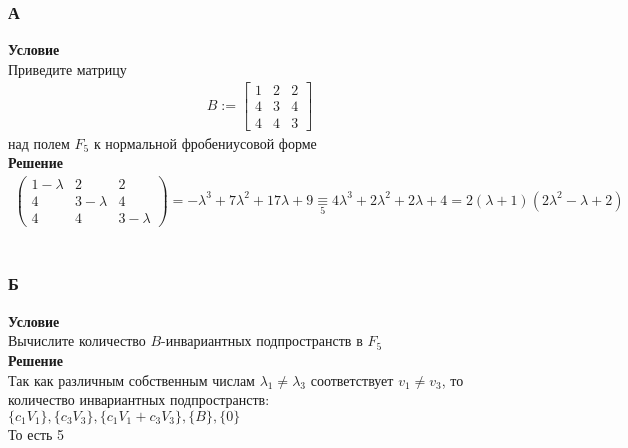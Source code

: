		\subsubsection*{\textbf{А}}
		\textbf{Условие}\\
		Приведите матрицу 
		\begin{gather*}
			B:=
			\left[\begin{array}{lll}
				1 & 2 & 2 \\
				4 & 3 & 4 \\
				4 & 4 & 3
			\end{array}\right]
		\end{gather*}
		над полем $F_5$ к нормальной фробениусовой форме
		\\
		\textbf{Решение}\\
		\begin{gather*}
			\begin{pmatrix}
				1 - \lambda & 2 & 2 \\
				4 & 3 - \lambda & 4 \\
				4 & 4 & 3 - \lambda 
			\end{pmatrix}
			=
			-\lambda^3 + 7\lambda^2 + 17\lambda + 9 \underset{5}{\equiv} 4\lambda^3 + 2\lambda^2 + 2\lambda + 4 = 2(\lambda + 1)(2\lambda^2 - \lambda + 2)
		\end{gather*}
		\\
		
		\subsubsection*{\textbf{Б}}
		\textbf{Условие}\\
		 Вычислите количество $B$-инвариантных подпространств в $F_5$
		\\
		\textbf{Решение}\\
		Так как различным собственным числам $\lambda_1 \ne \lambda_3$ соответствует $v_1 \ne v_3$, то количество инвариантных подпространств:\\
		$\{c_1V_1\}, \{c_3V_3\}, \{c_1V_1 + c_3V_3\}, \{B\}, \{0\}$\\
		То есть 5 
		\\
		